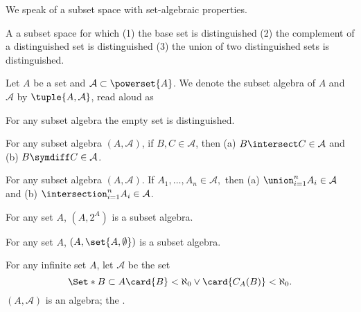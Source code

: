 
\sbasic



\sstart



We speak of a subset space
with set-algebraic
properties.


A 
a subset space for which
(1) the base set is distinguished
(2) the complement of a distinguished
set is distinguished
(3) the union of two distinguished sets
is distinguished.


Let $A$ be a set and $\mathcal{A} \subset \powerset{A}$.
We denote the subset algebra of $A$ and $\mathcal{A}$
by $\tuple{A, \mathcal{A}}$, read aloud as 


\begin{prop}
  For any subset algebra the empty set is distinguished.
\end{prop}

\begin{prop}
  For any subset algebra $(A, \mathcal{A})$,
  if $B, C \in \mathcal{A}$, then
  (a) $B \intersect C \in \mathcal{A}$ and
  (b) $B \symdiff C \in \mathcal{A}$.
\end{prop}

\begin{prop}
  For any subset algebra $(A, \mathcal{A})$.
  If $A_1, \dots, A_n \in \mathcal{A},$ then
  (a) $\union_{i = 1}^{n} A_i \in \mathcal{A}$ and
  (b) $\intersection_{i = 1}^{n} A_i \in \mathcal{A}$.
\end{prop}


\begin{expl}
  For any set $A$, $(A, 2^{A})$ is a subset algebra.
\end{expl}

\begin{expl}
  For any set $A$, $(A, \set{A, \emptyset})$ is a subset algebra.
\end{expl}

\begin{expl}
  For any infinite set $A$,
  let $\mathcal{A}$ be the set
  $$
  \Set*{
    B \subset A
  }{
    \card{B} < \aleph_0 \lor
    \card{C_{A}(B)} < \aleph_0
  }.
  $$
  $(A, \mathcal{A})$ is an algebra;
  the
  .
\end{expl}

